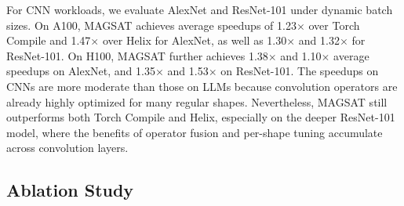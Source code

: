 For CNN workloads, we evaluate AlexNet and ResNet-101 under dynamic batch sizes. 
On A100, MAGSAT achieves average speedups of 1.23$\times$ over Torch Compile and 1.47$\times$ over Helix for AlexNet, as well as 1.30$\times$ and 1.32$\times$ for ResNet-101.
On H100, MAGSAT further achieves
1.38$\times$ and 1.10$\times$ average speedups on AlexNet, and 1.35$\times$ and 1.53$\times$ on ResNet-101.
The speedups on CNNs are
more moderate than those on LLMs because convolution operators are already
highly optimized for many regular shapes. Nevertheless, MAGSAT still
outperforms both Torch Compile and Helix,
especially on the deeper ResNet-101 model, where the benefits of
operator fusion and per-shape tuning accumulate across convolution
layers. 

\subsection{Ablation Study}
\label{sec:ablation}

